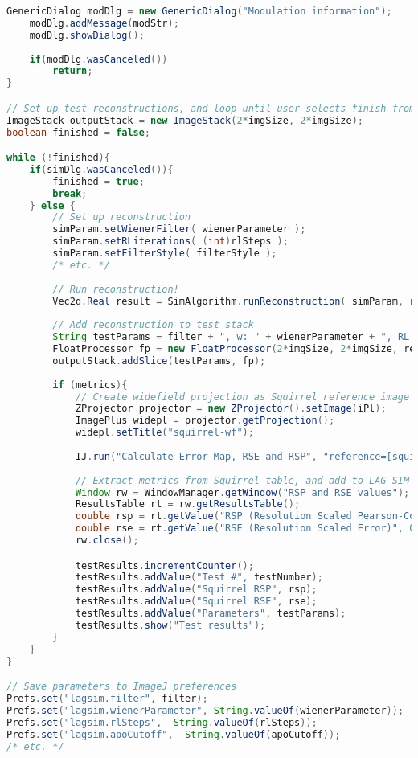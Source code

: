 \begin{lstlisting}[language=java,caption={Extracts from the Beanshell script used for the LAG SIM parameter tester},label={snip:lagsim-fiji},frame=single]
	GenericDialog modDlg = new GenericDialog("Modulation information");
	modDlg.addMessage(modStr);
	modDlg.showDialog();
						
	if(modDlg.wasCanceled())
		return;
}

// Set up test reconstructions, and loop until user selects finish from the dialog
ImageStack outputStack = new ImageStack(2*imgSize, 2*imgSize);
boolean finished = false;

while (!finished){
	if(simDlg.wasCanceled()){
		finished = true;
		break;
	} else {
		// Set up reconstruction
		simParam.setWienerFilter( wienerParameter );
		simParam.setRLiterations( (int)rlSteps );
		simParam.setFilterStyle( filterStyle );
		/* etc. */
		
		// Run reconstruction! 
		Vec2d.Real result = SimAlgorithm.runReconstruction( simParam, rawImages, idf, visualFeedback, otfBeforeShift, clipscale, null );
		
		// Add reconstruction to test stack
		String testParams = filter + ", w: " + wienerParameter + ", RL: " + (int)rlSteps + ", apoC: " + apoCutoff + ", apoS: " + apoBend + ", at?: " + (otfAttenuation ? "true" : "false") + ", attFW: " + attenFWHM +  ", atS: " + attenStrength; 
		FloatProcessor fp = new FloatProcessor(2*imgSize, 2*imgSize, res);
		outputStack.addSlice(testParams, fp);
		
		if (metrics){
			// Create widefield projection as Squirrel reference image
			ZProjector projector = new ZProjector().setImage(iPl);
			ImagePlus widepl = projector.getProjection();
			widepl.setTitle("squirrel-wf");
		
			IJ.run("Calculate Error-Map, RSE and RSP", "reference=[squirrel-wf] super-resolution=[squirrel-sr] rsf=[-- RSF unknown, estimate via optimisation --] max.=5 crop enable maximum=0 show show_rsf-convolved");
		
			// Extract metrics from Squirrel table, and add to LAG SIM test table
			Window rw = WindowManager.getWindow("RSP and RSE values");
			ResultsTable rt = rw.getResultsTable();
			double rsp = rt.getValue("RSP (Resolution Scaled Pearson-Correlation)", 0);
			double rse = rt.getValue("RSE (Resolution Scaled Error)", 0);
			rw.close();

			testResults.incrementCounter();
			testResults.addValue("Test #", testNumber);
			testResults.addValue("Squirrel RSP", rsp);
			testResults.addValue("Squirrel RSE", rse);
			testResults.addValue("Parameters", testParams);
			testResults.show("Test results");		
		}
	}
}

// Save parameters to ImageJ preferences
Prefs.set("lagsim.filter", filter);
Prefs.set("lagsim.wienerParameter", String.valueOf(wienerParameter));
Prefs.set("lagsim.rlSteps",  String.valueOf(rlSteps));
Prefs.set("lagsim.apoCutoff",  String.valueOf(apoCutoff));
/* etc. */

\end{lstlisting}